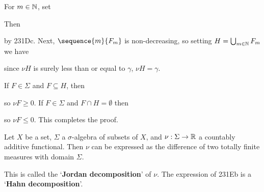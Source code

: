 { For $m\in\Bbb N$, set 
      
      
\noindent Then 
      
      
\noindent by 231Dc. 
Next, $\sequence{m}{F_m}$ is non-decreasing, so setting 
$H=\bigcup_{m\in\Bbb N}F_m$ we have 
      
      
\noindent  since $\nu H$ 
is surely less than or equal to $\gamma$, $\nu H=\gamma$. 
      
\medskip

 If $F\in\Sigma$ and $F\subseteq H$, then 
      
      
\noindent so $\nu F\ge 0$.   If $F\in\Sigma$ and $F\cap 
H=\emptyset$ then 
      
      
\noindent so $\nu F\le 
0$.   This completes the proof. 
}%
      
      
 Let $X$ be a set, $\Sigma$ a $\sigma$-algebra 
of subsets of $X$, and $\nu:\Sigma\to\Bbb R$ a countably additive 
functional.   Then $\nu$ can be expressed as the difference of two 
totally finite measures with domain $\Sigma$. 
      
      
\medskip 
      
 This is called the `{\bf Jordan decomposition}' 
of 
$\nu$.   The expression of 231Eb is a `{\bf Hahn decomposition}'. 
      
      
      
